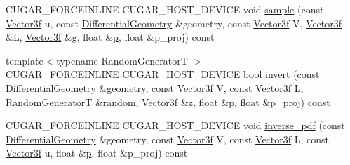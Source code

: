 \begin{DoxyCompactItemize}
\item 
C\+U\+G\+A\+R\+\_\+\+F\+O\+R\+C\+E\+I\+N\+L\+I\+NE C\+U\+G\+A\+R\+\_\+\+H\+O\+S\+T\+\_\+\+D\+E\+V\+I\+CE void \hyperlink{structcugar_1_1_blend_bsdf_ad2aff372bc3fa24b90e99505d7cb7c37}{sample} (const \hyperlink{structcugar_1_1_vector}{Vector3f} u, const \hyperlink{structcugar_1_1_differential_geometry}{Differential\+Geometry} \&geometry, const \hyperlink{structcugar_1_1_vector}{Vector3f} V, \hyperlink{structcugar_1_1_vector}{Vector3f} \&L, \hyperlink{structcugar_1_1_vector}{Vector3f} \&g, float \&\hyperlink{structcugar_1_1_blend_bsdf_a682a0bffe043ff21a03d519921bef7bc}{p}, float \&p\+\_\+proj) const
\item 
{\footnotesize template$<$typename Random\+GeneratorT $>$ }\\C\+U\+G\+A\+R\+\_\+\+F\+O\+R\+C\+E\+I\+N\+L\+I\+NE C\+U\+G\+A\+R\+\_\+\+H\+O\+S\+T\+\_\+\+D\+E\+V\+I\+CE bool \hyperlink{structcugar_1_1_blend_bsdf_ae441aab40fa52f1223cd34cafede6a41}{invert} (const \hyperlink{structcugar_1_1_differential_geometry}{Differential\+Geometry} \&geometry, const \hyperlink{structcugar_1_1_vector}{Vector3f} V, const \hyperlink{structcugar_1_1_vector}{Vector3f} L, Random\+GeneratorT \&\hyperlink{group___sampling_module_gaec17bbbfd36295353081b7b4480d933d}{random}, \hyperlink{structcugar_1_1_vector}{Vector3f} \&z, float \&\hyperlink{structcugar_1_1_blend_bsdf_a682a0bffe043ff21a03d519921bef7bc}{p}, float \&p\+\_\+proj) const
\item 
C\+U\+G\+A\+R\+\_\+\+F\+O\+R\+C\+E\+I\+N\+L\+I\+NE C\+U\+G\+A\+R\+\_\+\+H\+O\+S\+T\+\_\+\+D\+E\+V\+I\+CE void \hyperlink{structcugar_1_1_blend_bsdf_a5bfb9e04adb1ba5a5a2cebc49b137561}{inverse\+\_\+pdf} (const \hyperlink{structcugar_1_1_differential_geometry}{Differential\+Geometry} \&geometry, const \hyperlink{structcugar_1_1_vector}{Vector3f} V, const \hyperlink{structcugar_1_1_vector}{Vector3f} L, const \hyperlink{structcugar_1_1_vector}{Vector3f} u, float \&\hyperlink{structcugar_1_1_blend_bsdf_a682a0bffe043ff21a03d519921bef7bc}{p}, float \&p\+\_\+proj) const
\end{DoxyCompactItemize}
